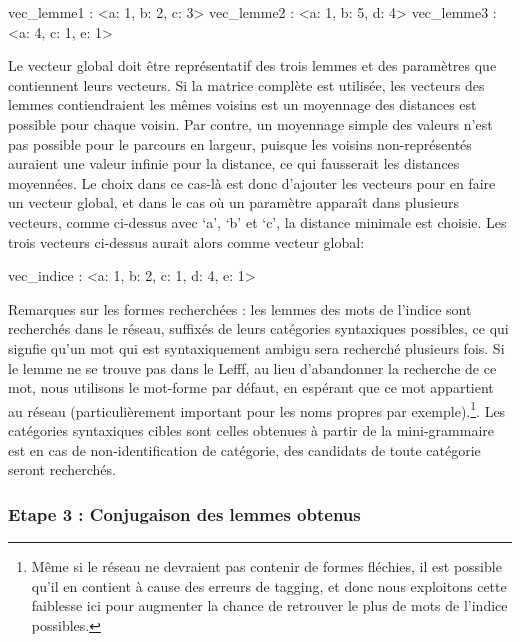 \begin{framed}
vec\_lemme1 : \textless{a: 1, b: 2, c: 3}\textgreater \newline
vec\_lemme2 : \textless{a: 1, b: 5, d: 4}\textgreater \newline
vec\_lemme3 : \textless{a: 4, c: 1, e: 1}\textgreater 
\end{framed}

Le vecteur global doit être représentatif des trois lemmes et des paramètres que contiennent leurs vecteurs. Si la matrice complète est utilisée, les vecteurs des lemmes contiendraient les mêmes voisins est un moyennage des distances est possible pour chaque voisin. Par contre, un moyennage simple des valeurs n'est pas possible pour le parcours en largeur, puisque les voisins non-représentés auraient une valeur infinie pour la distance, ce qui fausserait les distances moyennées. Le choix dans ce cas-là est donc d'ajouter les vecteurs pour en faire un vecteur global, et dans le cas où un paramètre apparaît dans plusieurs vecteurs, comme ci-dessus avec \lq{a}\rq{}, \lq{b}\rq{} et \lq{c}\rq{}, la distance minimale est choisie. Les trois vecteurs ci-dessus aurait alors comme vecteur global:

\begin{framed}
vec\_indice : \textless{a: 1, b: 2, c: 1, d: 4, e: 1}\textgreater 
\end{framed}

Remarques sur les formes recherchées : les lemmes des mots de l'indice sont recherchés dans le réseau, suffixés de leurs catégories syntaxiques possibles, ce qui signfie qu'un mot qui est syntaxiquement ambigu sera recherché plusieurs fois. Si le lemme ne se trouve pas dans le Lefff, au lieu d'abandonner la recherche de ce mot, nous utilisons le mot-forme par défaut, en espérant que ce mot appartient au réseau (particulièrement important pour les noms propres par exemple).\footnote{Même si le réseau ne devraient pas contenir de formes fléchies, il est possible qu'il en contient à cause des erreurs de tagging, et donc nous exploitons cette faiblesse ici pour augmenter la chance de retrouver le plus de mots de l'indice possibles.}. Les catégories syntaxiques cibles sont celles obtenues à partir de la mini-grammaire est en cas de non-identification de catégorie, des candidats de toute catégorie seront recherchés.

\subsubsection{Etape 3 : Conjugaison des lemmes obtenus}%

